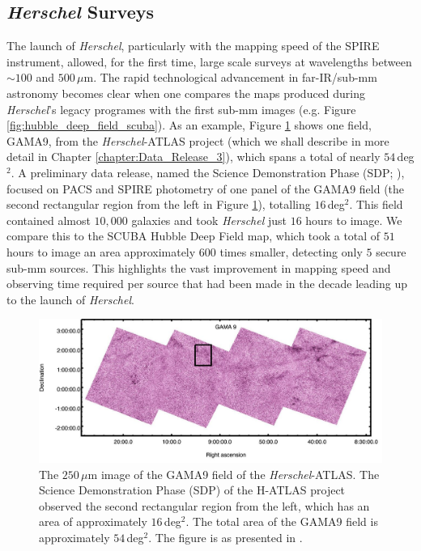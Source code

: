 \subsection{\textit{Herschel} Surveys}

The launch of \textit{Herschel}, particularly with the mapping speed of the SPIRE instrument, allowed, for the first time, large scale surveys at wavelengths between $\sim 100$ and $500\,\mu$m. The rapid technological advancement in far-IR/sub-mm astronomy becomes clear when one compares the maps produced during \textit{Herschel}'s legacy programes with the first sub-mm images (e.g. Figure \ref{fig:hubble_deep_field_scuba}). As an example, Figure \ref{fig:gama9} shows one field, GAMA9, from the \textit{Herschel}-ATLAS project (which we shall describe in more detail in Chapter \ref{chapter:Data_Release_3}), which spans a total of nearly $54\,$deg$^2$. A preliminary data release, named the Science Demonstration Phase (SDP; \citealt{Ibar_2010, Rigby_2011, Pascale_2011}), focused on PACS and SPIRE photometry of one panel of the GAMA9 field (the second rectangular region from the left in Figure \ref{fig:gama9}), totalling $16\,$deg$^2$. This field contained almost $10,000$ galaxies and took \textit{Herschel} just $16$ hours to image. We compare this to the SCUBA Hubble Deep Field map, which took a total of $51$ hours to image an area approximately $600$ times smaller, detecting only $5$ secure sub-mm sources. This highlights the vast improvement in mapping speed and observing time required per source that had been made in the decade leading up to the launch of \textit{Herschel}.

\begin{figure}
    \centering
	\includegraphics[width=0.9\columnwidth]{Figures/GAMA9.pdf}
	\caption[$250\,\mu$m map of the GAMA9 field of H-ATLAS]{The $250\,\mu$m image of the GAMA9 field of the \textit{Herschel}-ATLAS. The Science Demonstration Phase (SDP) of the H-ATLAS project observed the second rectangular region from the left, which has an area of approximately $16\,$deg$^2$. The total area of the GAMA9 field is approximately $54\,$deg$^2$. The figure is as presented in \citealt{Valiante_2016}.}
	\label{fig:gama9}
\end{figure}

